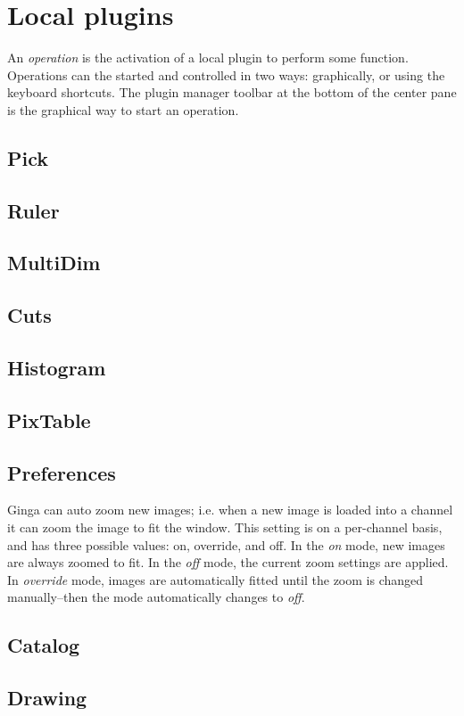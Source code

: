 \documentclass[11pt]{report}
\begin{document}
\section{Local plugins}

An {\em operation} is the activation of a local plugin to perform some
function.  Operations can the started and controlled in two ways:
graphically, or using the keyboard shortcuts.  The plugin manager
toolbar at the bottom of the center pane is the graphical way to start
an operation.  


\subsection{Pick}
\subsection{Ruler}
\subsection{MultiDim}
\subsection{Cuts}
\subsection{Histogram}
\subsection{PixTable}
\subsection{Preferences}

Ginga can auto zoom new images; i.e. when a new image is loaded into a
channel it can zoom the image to fit the window.  This setting is on a
per-channel basis, and has three possible values: on, override, and off.
In the \emph{on} mode, new images are always zoomed to fit.  In the 
\emph{off} mode, the current zoom settings are applied.  In
\emph{override} mode, images are automatically fitted until the zoom is
changed manually--then the mode automatically changes to \emph{off}.

\subsection{Catalog}
\subsection{Drawing}
\end{document}
